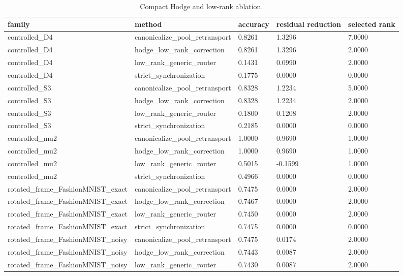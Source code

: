 \begin{table}[t]
\centering
\caption{Compact Hodge and low-rank ablation.}
\begin{tabular}{lllll}
\toprule
family & method & accuracy & residual reduction & selected rank \\
\midrule
controlled\_D4 & canonicalize\_pool\_retransport & 0.8261 & 1.3296 & 7.0000 \\
controlled\_D4 & hodge\_low\_rank\_correction & 0.8261 & 1.3296 & 2.0000 \\
controlled\_D4 & low\_rank\_generic\_router & 0.1431 & 0.0990 & 2.0000 \\
controlled\_D4 & strict\_synchronization & 0.1775 & 0.0000 & 0.0000 \\
controlled\_S3 & canonicalize\_pool\_retransport & 0.8328 & 1.2234 & 5.0000 \\
controlled\_S3 & hodge\_low\_rank\_correction & 0.8328 & 1.2234 & 2.0000 \\
controlled\_S3 & low\_rank\_generic\_router & 0.1800 & 0.1208 & 2.0000 \\
controlled\_S3 & strict\_synchronization & 0.2185 & 0.0000 & 0.0000 \\
controlled\_mu2 & canonicalize\_pool\_retransport & 1.0000 & 0.9690 & 1.0000 \\
controlled\_mu2 & hodge\_low\_rank\_correction & 1.0000 & 0.9690 & 1.0000 \\
controlled\_mu2 & low\_rank\_generic\_router & 0.5015 & -0.1599 & 1.0000 \\
controlled\_mu2 & strict\_synchronization & 0.4966 & 0.0000 & 0.0000 \\
rotated\_frame\_FashionMNIST\_exact & canonicalize\_pool\_retransport & 0.7475 & 0.0000 & 2.0000 \\
rotated\_frame\_FashionMNIST\_exact & hodge\_low\_rank\_correction & 0.7467 & 0.0000 & 2.0000 \\
rotated\_frame\_FashionMNIST\_exact & low\_rank\_generic\_router & 0.7450 & 0.0000 & 2.0000 \\
rotated\_frame\_FashionMNIST\_exact & strict\_synchronization & 0.7475 & 0.0000 & 0.0000 \\
rotated\_frame\_FashionMNIST\_noisy & canonicalize\_pool\_retransport & 0.7475 & 0.0174 & 2.0000 \\
rotated\_frame\_FashionMNIST\_noisy & hodge\_low\_rank\_correction & 0.7443 & 0.0087 & 2.0000 \\
rotated\_frame\_FashionMNIST\_noisy & low\_rank\_generic\_router & 0.7430 & 0.0087 & 2.0000 \\

\end{tabular}
\end{table}
